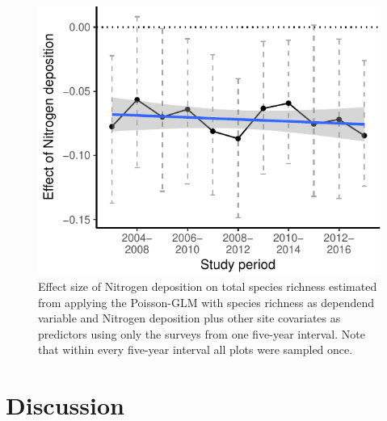 \documentclass[fleqn,10pt,lineno]{wlpeerj} %
\theoremstyle{definition}
\theoremstyle{definition}
\theoremstyle{definition}
\theoremstyle{remark}
\begin{document}
\begin{figure}
\includegraphics[width=0.5\linewidth]{Manuscript_files/figure-latex/figconsequences-1} \caption{Effect size of Nitrogen deposition on total species richness estimated from applying the Poisson-GLM with species richness as dependend variable and Nitrogen deposition plus other site covariates as predictors using only the surveys from one five-year interval. Note that within every five-year interval all plots were sampled once.}\label{fig:figconsequences}
\end{figure}

\section*{Discussion}\label{discussion}
\end{document}
